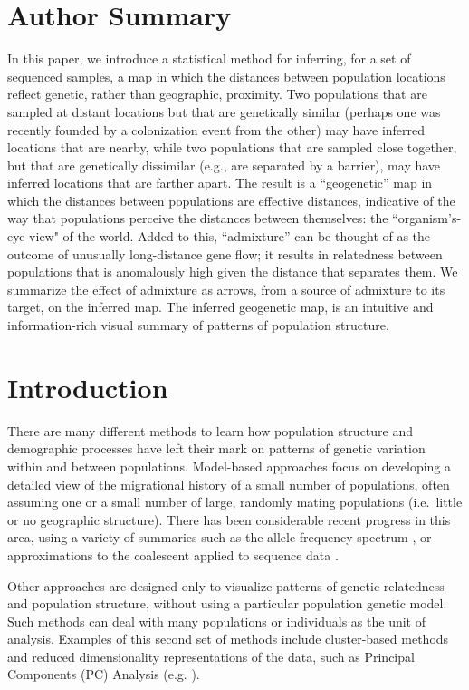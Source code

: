 \documentclass[12pt]{article}
\begin{document}
\section*{Author Summary}
In this paper, we introduce a statistical method for inferring, for a set of sequenced samples, 
a map in which the distances between population locations reflect genetic, rather than geographic, proximity.  
Two populations that are sampled at distant locations but that are genetically similar 
(perhaps one was recently founded by a colonization event from the other) 
may have inferred locations that are nearby, while two populations that are sampled close together, 
but that are genetically dissimilar (e.g., are separated by a barrier), may have inferred locations that are farther apart.   
The result is a ``geogenetic'' map in which the distances between populations are effective distances, 
indicative of the way that populations perceive the distances between themselves: the ``organism's-eye view" of the world.  
Added to this, ``admixture'' can be thought of as the outcome of unusually long-distance gene flow; 
it results in relatedness between populations that is anomalously high given the distance that separates them.
We summarize the effect of admixture as arrows, from a source of admixture to its target, on the inferred map.
The inferred geogenetic map, is an intuitive and information-rich visual summary of patterns of population structure.

\section*{Introduction}
There are many different methods to learn how population structure and demographic processes have left their mark on 
patterns of genetic variation within and between populations.
Model-based approaches focus on developing a detailed view of the migrational history of a small number of populations,
often assuming one or a small number of large, randomly mating populations (i.e.\ little or no geographic structure).
There has been considerable recent progress in this area, using a variety of summaries such as the allele frequency spectrum \citep{dadi, Bhaskar2014, Excoffier2013}, 
or approximations to the coalescent applied to sequence data \citep{Paul_Song2011, Li_Durbin2011}.

Other approaches are designed only to visualize patterns of genetic relatedness and population structure,
without using a particular population genetic model.
Such methods can deal with many populations or individuals as the unit of analysis. 
Examples of this second set of methods include cluster-based methods \citep{STRUCTURE, ADMIXTURE, FINESTRUCTURE} and reduced dimensionality representations of the data, such as Principal Components (PC) Analysis (e.g. \citep{cavallisforza1994, Patterson2006, price2006eigenstrat}).  
\end{document}
